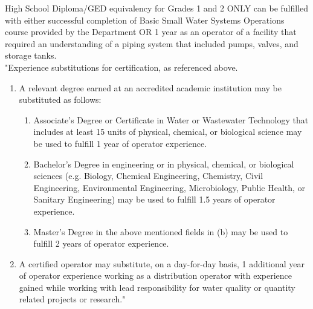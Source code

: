 \begin{tiny}

High School Diploma/GED equivalency for Grades 1 and 2 ONLY can be fulfilled with either successful completion of Basic Small Water Systems Operations course provided by the Department OR 1 year as an operator of a facility that required an understanding of a piping system that included pumps, valves, and storage tanks.\\

"Experience substitutions for certification, as referenced above.
\begin{enumerate}[]
\item A relevant degree earned at an accredited academic institution may be substituted as follows:
\begin{enumerate}[label=(\alph*)]
\item Associate’s Degree or Certificate in Water or Wastewater Technology that includes at least 15 units of physical, chemical, or biological science may be used to fulfill 1 year of operator experience.
\item Bachelor’s Degree in engineering or in physical, chemical, or biological sciences (e.g. Biology, Chemical Engineering, Chemistry, Civil Engineering, Environmental Engineering, Microbiology, Public Health, or Sanitary Engineering) may be used to fulfill 1.5 years of operator experience.
\item Master’s Degree in the above mentioned fields in (b) may be used to fulfill 2 years of operator experience.
\end{enumerate}
\item A certified operator may substitute, on a day-for-day basis, 1 additional year of operator experience working as a distribution operator with experience gained while working with lead responsibility for water quality or quantity related projects or research."	
\end{enumerate}	
\end{tiny}

